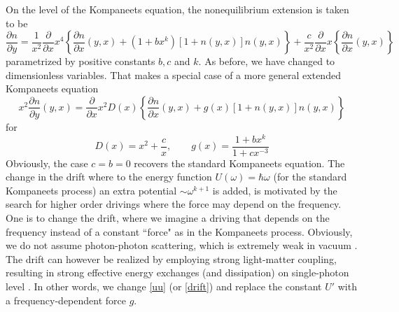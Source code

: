 \documentclass[a4paper,12pt,reqno,superscriptaddress,nofootinbib]{revtex4}
\newcommand{\0}{^{(0)}}
\newcommand{\1}{^{(1)}}
\newcommand{\2}{^{(2)}}
\begin{document}
On the level of the Kompaneets equation, the nonequilibrium extension is taken to be
\begin{equation}\label{extk}
\frac{\partial n}{\partial y}=\frac{1}{x^2}\frac{\partial}{\partial x} x^4 \left\{  \frac{\partial n}{\partial x} (y,x) +  (1+bx^k)[1+n(y,x)]n(y,x)\right\} + \frac{c}{x^2}\frac{\partial}{\partial x} x \left\{  \frac{\partial n}{\partial x} (y,x)\right\}
\end{equation}
parametrized by positive constants $b,c$ and $k$.
As before, we have changed to dimensionless variables.  That makes a special case of a more general extended Kompaneets equation
\begin{equation}\label{aeke}
	x^2 \frac{\partial n}{\partial y}(y,x) = \frac{\partial}{\partial x} x^2 D(x)\left\{  \frac{\partial n}{\partial x} (y,x) +  g(x)[1+n(y,x)]n(y,x)\right\}
\end{equation}
for
 \begin{equation}\label{ext-dri}
D(x)= x^2 + \frac c{x},\qquad  g(x)=\frac{1 + bx^k}{1+cx^{-3}}
\end{equation}
Obviously, the case $c=b=0$ recovers the standard Kompaneets equation.  
The change in the drift where to the energy function $U(\omega) = \hbar\omega$ (for the standard Kompaneets process) an extra potential $\sim \omega^{k+1}$ is added, is motivated by the search for higher order drivings where the force  may depend on the frequency. One is to change the drift, where we imagine a driving that depends on the frequency instead of a constant ``force" as in the Kompaneets process.  Obviously, we do not assume photon-photon scattering, which is extremely weak in vacuum \cite{silveira}. The drift can however be realized by employing strong light-matter coupling, resulting in strong effective energy exchanges (and dissipation) on single-photon level \cite{roy2}.  In other words, we change \eqref{uu}  (or \eqref{drift}) and replace the constant $U'$ with a frequency-dependent force $g$.\\
\end{document}
